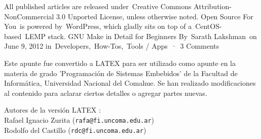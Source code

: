 \documentclass[12pt]{article}
\begin{document}
All published articles are released under Creative Commons Attribution-NonCommercial 3.0 Unported License, unless otherwise noted.
Open Source For You is powered by WordPress, which gladly sits on top of a CentOS-based LEMP stack.
GNU Make in Detail for Beginners
By Sarath Lakshman on June 9, 2012 in Developers, How-Tos, Tools / Apps · 3 Comments

Este apunte fue convertido a LATEX para 
ser utilizado como apunte en la materia de grado
'Programación de Sistemas Embebidos' de la Facultad de Informática,
Universidad Nacional del Comahue.
Se han realizado modificaciones
al contenido para aclarar ciertos detalles o agregar partes nuevas.

Autores de la versión LATEX : \\
Rafael Ignacio Zurita ({\tt rafa@fi.uncoma.edu.ar}) \\
Rodolfo del Castillo ({\tt rdc@fi.uncoma.edu.ar})
\end{document}
